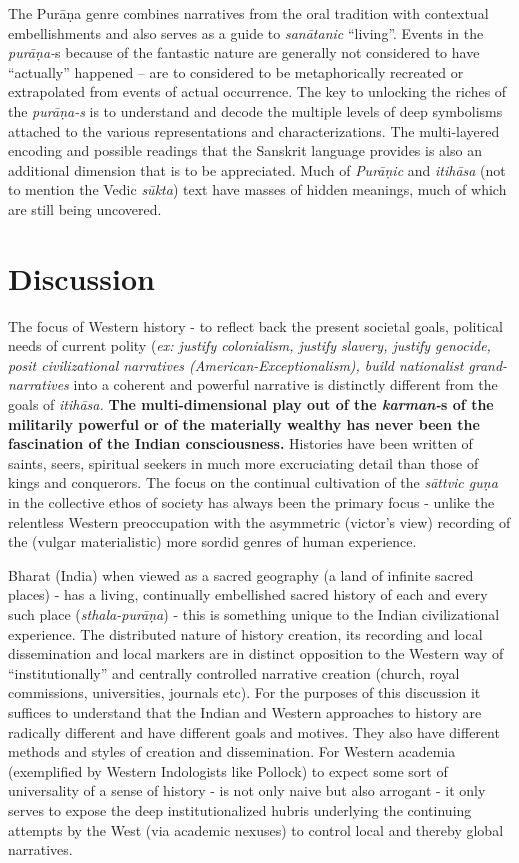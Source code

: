 The Purāṇa genre combines narratives from the oral tradition with contextual embellishments and also serves as a guide to \textit{sanātanic} “living”. Events in the \textit{purāṇa-}s because of the fantastic nature are generally not considered to have “actually” happened – are to considered to be metaphorically recreated or extrapolated from events of actual occurrence. The key to unlocking the riches of the \textit{purāṇa-s} is to understand and decode the multiple levels of deep symbolisms attached to the various representations and characterizations. The multi-layered encoding and possible readings that the Sanskrit language provides is also an additional dimension that is to be appreciated. Much of \textit{Purāṇic} and \textit{itihāsa} (not to mention the Vedic \textit{sūkta}) text have masses of hidden meanings, much of which are still being uncovered.


\section*{Discussion}

The focus of Western history - to reflect back the present societal goals, political needs of current polity (\textit{ex: justify colonialism, justify slavery, justify genocide, posit civilizational narratives (American-Exceptionalism), build nationalist grand-narratives} into a coherent and powerful narrative is distinctly different from the goals of \textit{itihāsa.} \textbf{The multi-dimensional play out of the \textit{karman-}s of the militarily powerful or of the materially wealthy has never been the fascination of the Indian consciousness.} Histories have been written of saints, seers, spiritual seekers in much more excruciating detail than those of kings and conquerors. The focus on the continual cultivation of the \textit{sāttvic guṇa} in the collective ethos of society has always been the primary focus - unlike the relentless Western preoccupation with the asymmetric (victor’s view) recording of the (vulgar materialistic) more sordid genres of human experience.

Bharat (India) when viewed as a sacred geography (a land of infinite sacred places) - has a living, continually embellished sacred history of each and every such place (\textit{sthala-purāṇa}) - this is something unique to the Indian civilizational experience. The distributed nature of history creation, its recording and local dissemination and local markers are in distinct opposition to the Western way of “institutionally” and centrally controlled narrative creation (church, royal commissions, universities, journals etc). For the purposes of this discussion it suffices to understand that the Indian and Western approaches to history are radically different and have different goals and motives. They also have different methods and styles of creation and dissemination. For Western academia (exemplified by Western Indologists like Pollock) to expect some sort of universality of a sense of history - is not only naive but also arrogant - it only serves to expose the deep institutionalized hubris underlying the continuing attempts by the West (via academic nexuses) to control local and thereby global narratives.


